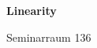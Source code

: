 \documentclass[a4paper]{article}
\begin{document}
\printGenericVSLHeader
\begin{center}
\begin{vsltext}{3cm}{4cm}

   \vspace{0.5cm} 

    \textbf{Linearity} 

    \vspace{1.5cm}

    Seminarraum 136

\end{vsltext}

\end{center}
\end{document}
